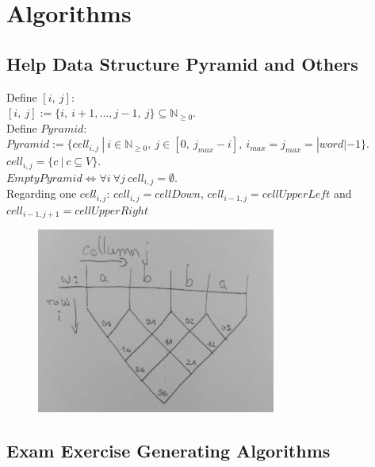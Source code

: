 
\section{Algorithms}\label{algorithms}

\subsection{Help Data Structure Pyramid and Others}

\noindent Define $[i,\ j]$: \\
$[i,\ j] := \{i,\ i+1,..., j-1,\ j\} \subseteq \mathbb{N}_{\geq 0}$.\\

\noindent Define $Pyramid$:\\
$Pyramid :=\{ cell_{i,j}\ |\ i \in \mathbb{N}_{\geq 0},\  j \in [0,\ j_{max}-i],\ i_{max} = j_{max} = |word|-1\}$.\\
$cell_{i,j} = \{c\ |\ c \subseteq V\}$.\\
$EmptyPyramid \Leftrightarrow \forall i\ \forall j\ cell_{i,j}=\emptyset$.\\
Regarding one $cell_{i,j}$: $cell_{i,j} = cellDown$, $cell_{i-1,j} = cellUpperLeft$ and $cell_{i-1,j+1} = cellUpperRight$  \\

\begin{figure}[h]
	\centering
	\includegraphics[width=0.7\textwidth]{abb/DataStructurePyramid}
\end{figure}

\pagebreak
\subsection{Exam Exercise Generating Algorithms}

